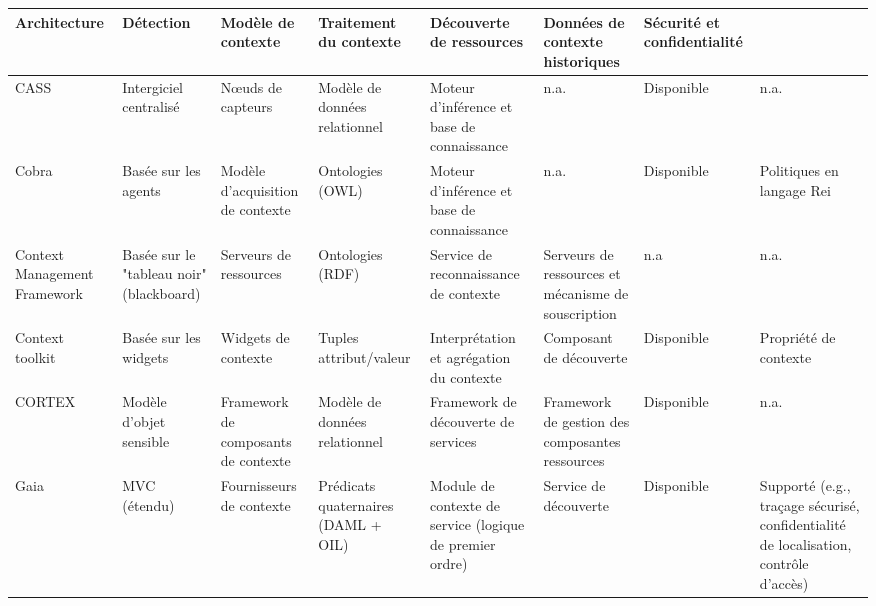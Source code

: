 \begin{table}%
    \tiny
    \begin{tabularx}{\linewidth}{
      >{\raggedright\arraybackslash}X
      >{\raggedright\arraybackslash}X
      >{\raggedright\arraybackslash}X
      >{\raggedright\arraybackslash}X
      >{\raggedright\arraybackslash}X
      >{\raggedright\arraybackslash}X
      >{\raggedright\arraybackslash}X
      >{\raggedright\arraybackslash}X
    }
        \hline
        \textbf{Architecture} & 
        \textbf{Détection} & 
        \textbf{Modèle de contexte} &
        \textbf{Traitement du contexte} &
        \textbf{Découverte de ressources} &
        \textbf{Données de contexte historiques} &
        \textbf{Sécurité et confidentialité} & 
        \\
        \hline
        CASS &
        Intergiciel centralisé &
        Nœuds de capteurs &
        Modèle de données relationnel &
        Moteur d'inférence et base de connaissance &
        n.a. &
        Disponible &
        n.a.\\

        Cobra &
        Basée sur les agents &
        Modèle d'acquisition de contexte &
        Ontologies (OWL) &
        Moteur d'inférence et base de connaissance &
        n.a. &
        Disponible &
        Politiques en langage Rei\\

        Context Management Framework &
        Basée sur le "tableau noir" (blackboard) &
        Serveurs de ressources &
        Ontologies (RDF) &
        Service de reconnaissance de contexte &
        Serveurs de ressources et mécanisme de souscription &
        n.a &
        n.a.\\

        Context toolkit &
        Basée sur les widgets &
        Widgets de contexte &
        Tuples attribut/valeur &
        Interprétation et agrégation du contexte &
        Composant de découverte &
        Disponible &
        Propriété de contexte\\

        CORTEX &
        Modèle d'objet sensible &
        Framework de composants de contexte &
        Modèle de données relationnel &
        Framework de découverte de services &
        Framework de gestion des composantes ressources &
        Disponible &
        n.a.\\

        Gaia &
        MVC (étendu) &
        Fournisseurs de contexte &
        Prédicats quaternaires (DAML + OIL) &
        Module de contexte de service (logique de premier ordre) &
        Service de découverte &
        Disponible &
        Supporté (e.g., traçage sécurisé, confidentialité de localisation,
        contrôle d'accès)\\


\end{tabularx}
\end{table}
